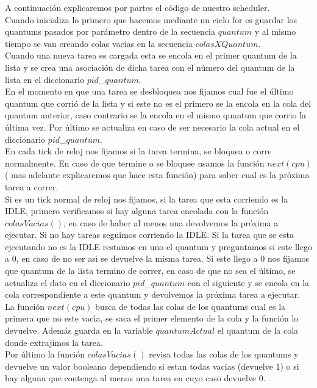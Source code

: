A continuación explicaremos por partes el c\'{o}digo de nuestro scheduler.\\
Cuando inicializa lo primero que hacemos mediante un ciclo for es guardar los quantums pasados por par\'{a}metro dentro de la 
secuencia $quantum$ y al mismo tiempo se van creando colas vacias en la secuencia $colasXQuantum$.\\
Cuando una nueva tarea es cargada esta se encola en el primer quantum de la lista y se crea una asociaci\'{o}n de dicha tarea 
con el número del quantum de la lista en el diccionario $pid$\_$quantum$.\\
En el momento en que una tarea se desbloquea nos fijamos cual fue el \'{u}ltimo quantum que corrió de la lista y si este no es 
el primero se la encola en la cola del quantum anterior, caso contrario se la encola en el mismo quantum que corrio la \'{u}ltima vez.
Por \'{u}ltimo se actualiza en caso de ser necesario la cola actual en el diccionario $pid$\_$quantum$.\\
En cada tick de reloj nos fijamos si la tarea termina, se bloquea o corre normalmente. En caso de que termine o se bloquee usamos 
la funci\'{o}n $next(cpu)$ ( mas adelante explicaremos que hace esta funci\'{o}n) para saber cual es la pr\'{o}xima 
tarea a correr. \\Si es un tick normal de reloj nos fijamos, si la tarea que esta corriendo es la IDLE, primero verificamos si hay 
alguna tarea encolada con la funci\'{o}n $colasVacias()$, en caso de haber al menos una devolvemos la pr\'{o}xima a ejecutar. Si 
no hay tareas seguimos corriendo la IDLE. Si la tarea que se esta ejecutando no es la IDLE restamos en uno el quantum y preguntamos 
si este llego a 0, en caso de no ser as\'{\i} se devuelve la misma tarea. Si este llego a 0 nos fijamos que quantum de la lista 
termino de correr, en caso de que no sea el \'{u}ltimo, se actualiza el dato en el diccionario $pid$\_$quantum$ con el siguiente y 
se encola en la cola correspondiente a este quantum y devolvemos la pr\'{o}xima tarea a ejecutar.\\
La funci\'{o}n $next(cpu)$ busca de todas las colas de los quantums cual es la primera que no este vac\'{\i}a, se saca el 
primer elemento de la cola y la funci\'{o}n lo devuelve. Adem\'{a}s guarda en la variable $quantumActual$ el quantum de la cola 
donde extrajimos la tarea.\\
Por \'{u}ltimo la funci\'{o}n $colasVacias()$ revisa todas las colas de los quantums y devuelve un valor booleano dependiendo si 
estan todas vacias (devuelve 1) o si hay alguna que contenga al menos una tarea en cuyo caso devuelve 0.\\


